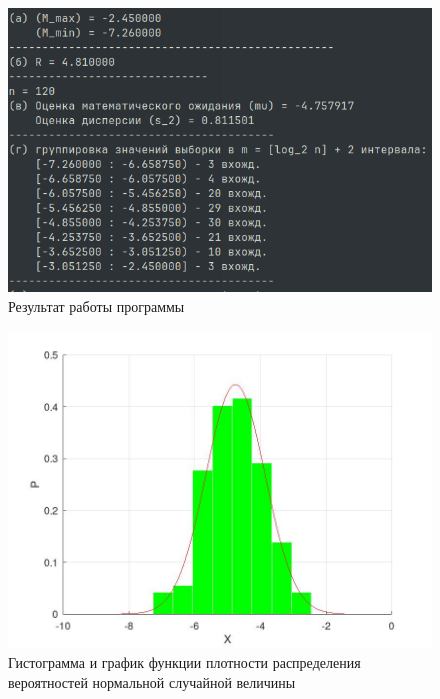 \begin{figure}[ht!]
	\begin{center}
		\includegraphics[scale=0.5]{assets/launch.png}
		\caption{Результат работы программы}
	\end{center}
\end{figure}

\begin{figure}[ht!]
	\begin{center}
		\includegraphics[scale=0.4]{assets/hist.jpg}
		\caption{Гистограмма и график функции плотности распределения вероятностей нормальной случайной величины}
	\end{center}
\end{figure}

